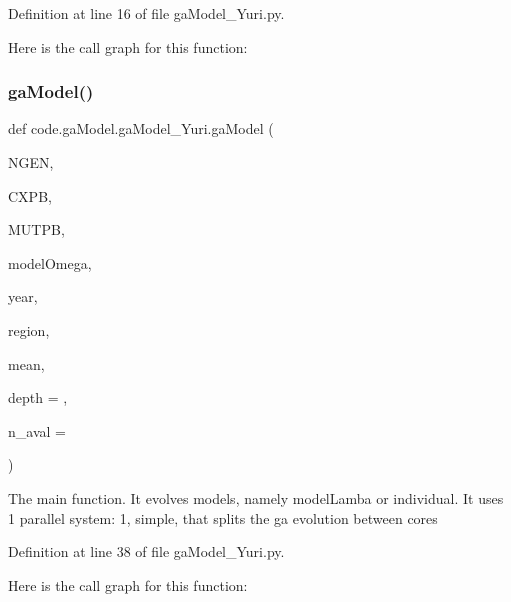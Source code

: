 Definition at line 16 of file ga\+Model\+\_\+\+Yuri.\+py.

Here is the call graph for this function\+:
\mbox{\label{namespacecode_1_1ga_model_1_1ga_model___yuri_a358c4a2cdf3f30fc75df90095a4b8355}} 
\subsubsection{\texorpdfstring{ga\+Model()}{gaModel()}}
{\footnotesize\ttfamily def code.\+ga\+Model.\+ga\+Model\+\_\+\+Yuri.\+ga\+Model (\begin{DoxyParamCaption}\item[{}]{N\+G\+EN,  }\item[{}]{C\+X\+PB,  }\item[{}]{M\+U\+T\+PB,  }\item[{}]{model\+Omega,  }\item[{}]{year,  }\item[{}]{region,  }\item[{}]{mean,  }\item[{}]{depth = {},  }\item[{}]{n\+\_\+aval = {} }\end{DoxyParamCaption})}

\begin{DoxyVerb}The main function. It evolves models, namely modelLamba or individual. 
It uses 1 parallel system: 1, simple, that splits the ga evolution between cores
\end{DoxyVerb}
 

Definition at line 38 of file ga\+Model\+\_\+\+Yuri.\+py.

Here is the call graph for this function\+:
